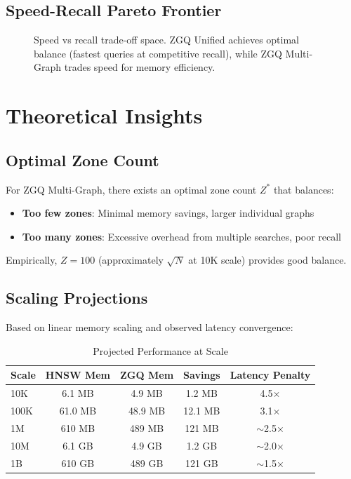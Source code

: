 \documentclass[11pt,a4paper]{article}
\begin{document}
\subsection{Speed-Recall Pareto Frontier}

\begin{figure}[h]
\centering
{}
\caption{Speed vs recall trade-off space. ZGQ Unified achieves optimal balance (fastest queries at competitive recall), while ZGQ Multi-Graph trades speed for memory efficiency.}
\label{fig:speed_recall}
\end{figure}

\section{Theoretical Insights}

\subsection{Optimal Zone Count}

For ZGQ Multi-Graph, there exists an optimal zone count $Z^*$ that balances:
\begin{itemize}
    \item \textbf{Too few zones}: Minimal memory savings, larger individual graphs
    \item \textbf{Too many zones}: Excessive overhead from multiple searches, poor recall
\end{itemize}

Empirically, $Z = 100$ (approximately $\sqrt{N}$ at 10K scale) provides good balance.

\subsection{Scaling Projections}

Based on linear memory scaling and observed latency convergence:

\begin{table}[h]
\centering
\caption{Projected Performance at Scale}
\begin{tabular}{lcccc}
\toprule
\textbf{Scale} & \textbf{HNSW Mem} & \textbf{ZGQ Mem} & \textbf{Savings} & \textbf{Latency Penalty} \\
\midrule
10K & 6.1 MB & 4.9 MB & 1.2 MB & 4.5× \\
100K & 61.0 MB & 48.9 MB & 12.1 MB & 3.1× \\
1M & 610 MB & 489 MB & 121 MB & $\sim$2.5× \\
10M & 6.1 GB & 4.9 GB & 1.2 GB & $\sim$2.0× \\
1B & 610 GB & 489 GB & 121 GB & $\sim$1.5× \\
\bottomrule
\end{tabular}
\end{table}
\end{document}
